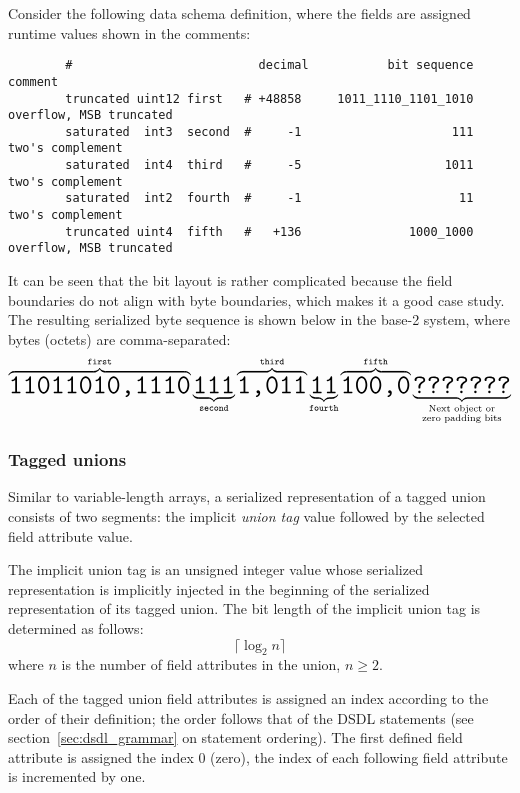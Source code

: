 \begin{remark}
    Consider the following data schema definition,
    where the fields are assigned runtime values shown in the comments:

    \begin{verbatim}
        #                          decimal           bit sequence   comment
        truncated uint12 first   # +48858     1011_1110_1101_1010   overflow, MSB truncated
        saturated  int3  second  #     -1                     111   two's complement
        saturated  int4  third   #     -5                    1011   two's complement
        saturated  int2  fourth  #     -1                      11   two's complement
        truncated uint4  fifth   #   +136               1000_1000   overflow, MSB truncated
    \end{verbatim}

    It can be seen that the bit layout is rather complicated because the field boundaries do not align with byte
    boundaries, which makes it a good case study.
    The resulting serialized byte sequence is shown below in the base-2 system,
    where bytes (octets) are comma-separated:
    $$
        \overbrace{\hugett{11011010,1110}}^{\texttt{first}}%
        \underbrace{\hugett{111}}_{\texttt{second}}%
        \overbrace{\hugett{1,011}}^{\texttt{third}}%
        \underbrace{\hugett{11}}_{\texttt{fourth}}%
        \overbrace{\hugett{100,0}}^{\texttt{fifth}}%
        \underbrace{\hugett{???????}}_{\substack{\text{Next object or} \\ \text{zero padding bits}}}
    $$
\end{remark}

\subsubsection{Tagged unions}

Similar to variable-length arrays, a serialized representation of a tagged union consists of two segments:
the implicit \emph{union tag} value followed by the selected field attribute value.

The implicit union tag is an unsigned integer value whose serialized representation
is implicitly injected in the beginning of the serialized representation of its tagged union.
The bit length of the implicit union tag is determined as follows:
$$\lceil{}\log_2 n\rceil{}$$
where $n$ is the number of field attributes in the union, $n \geq 2$.

Each of the tagged union field attributes is assigned an index according to the order of their definition;
the order follows that of the DSDL statements (see section~\ref{sec:dsdl_grammar} on statement ordering).
The first defined field attribute is assigned the index 0 (zero),
the index of each following field attribute is incremented by one.

